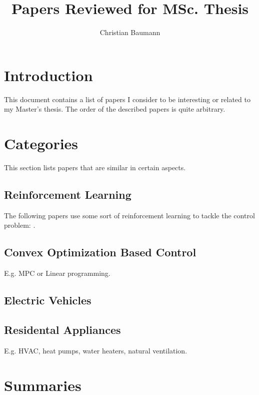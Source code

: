 \documentclass[a4paper]{article}
\title{Papers Reviewed for MSc. Thesis}
\author{Christian Baumann}
\begin{document}
\begin{multicols}{2}
	
	\maketitle
	
	\section{Introduction}
	\label{sec:intro}
	
	This document contains a list of papers I consider to
	be interesting or related to my Master's thesis.
	The order of the described papers is quite arbitrary.
	
	\section{Categories}
	
	This section lists papers that are similar in certain aspects.
	
	\subsection{Reinforcement Learning}
	
	The following papers use some sort of reinforcement learning 
	to tackle the control problem: 
	\cite{7401112, 6102330, 8060306, CHEN2018195, 7178338, 6695263, LDPWB2012, 
	8727484, 8335743, 7056534, 4717266}.
	
	\subsection{Convex Optimization Based Control}
	
	E.g. MPC or Linear programming. \cite{4717266}
	
	\subsection{Electric Vehicles}
	
	\subsection{Residental Appliances}
	
	E.g. HVAC, heat pumps, water heaters, natural ventilation.
	
	\section{Summaries}
	

\end{multicols}
\end{document}
